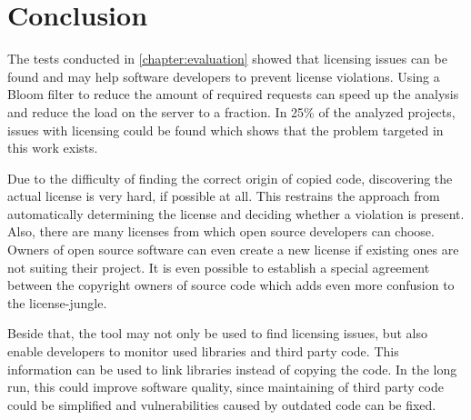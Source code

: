 
\chapter{Conclusion}\label{chapter:conclusion}
The tests conducted in \autoref{chapter:evaluation} showed that licensing issues can be found and may help software developers to prevent license violations.
Using a Bloom filter to reduce the amount of required requests can speed up the analysis and reduce the load on the server to a fraction.
In 25\% of the analyzed projects, issues with licensing could be found which shows that the problem targeted in this work exists.

Due to the difficulty of finding the correct origin of copied code, discovering the actual license is very hard, if possible at all.
This restrains the approach from automatically determining the license and deciding whether a violation is present.
Also, there are many licenses from which open source developers can choose.
Owners of open source software can even create a new license if existing ones are not suiting their project.
It is even possible to establish a special agreement between the copyright owners of source code which adds even more confusion to the license-jungle.

Beside that, the tool may not only be used to find licensing issues, but also enable developers to monitor used libraries and third party code.
This information can be used to link libraries instead of copying the code.
In the long run, this could improve software quality, since maintaining of third party code could be simplified and vulnerabilities caused by outdated code can be fixed.
